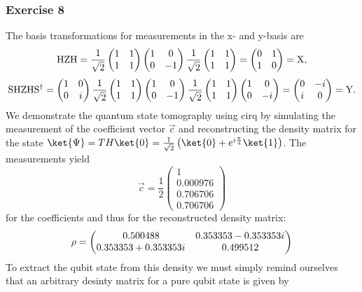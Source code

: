 \subsubsection{Exercise 8}
The basis transformations for measurements in the x- and y-basis are
\begin{equation}
\mathrm{HZH} = \frac{1}{\sqrt{2}}\begin{pmatrix} 1&1\\1&1\end{pmatrix} \begin{pmatrix} 1&0\\0&-1\end{pmatrix}  \frac{1}{\sqrt{2}}\begin{pmatrix} 1&1\\1&1\end{pmatrix}  = \begin{pmatrix} 0&1\\1&0\end{pmatrix} = \mathrm{X} ,
\end{equation}
\begin{equation}
    \mathrm{SHZHS^\dagger} = \begin{pmatrix} 1&0\\0&i\end{pmatrix}\frac{1}{\sqrt{2}}\begin{pmatrix} 1&1\\1&1\end{pmatrix} \begin{pmatrix} 1&0\\0&-1\end{pmatrix} \frac{1}{\sqrt{2}}\begin{pmatrix} 1&1\\1&1\end{pmatrix} \begin{pmatrix} 1&0\\0&-i\end{pmatrix} = \begin{pmatrix} 0&-i\\i&0\end{pmatrix} = \mathrm{Y}.
\end{equation}
We demonstrate the quantum state tomography using cirq by simulating the measurement of the coefficient vector $\vec{c}$ and reconstructing the density matrix for the state $\ket{\Psi} = TH\ket{0} = \frac{1}{\sqrt{2}} \left(\ket{0} + e^{i\frac{\pi}{4}}\ket{1}\right)$. The measurements yield 
\begin{equation}
\vec{c} = \frac{1}{2}\begin{pmatrix}1\\0.000976\\0.706706\\0.706706\end{pmatrix}
\end{equation}
for the coefficients and thus for the reconstructed density matrix:
\begin{equation}
    \rho = \begin{pmatrix}0.500488 & 0.353353-0.353353{i\mkern1mu} \\0.353353+0.353353{i\mkern1mu} & 0.499512\end{pmatrix}
\end{equation}
To extract the qubit state from this density we must simply remind ourselves that an arbitrary desinty matrix for a pure qubit state is given by 

